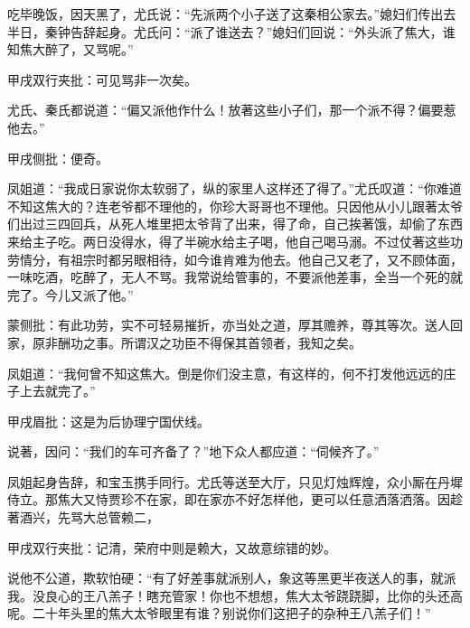 \begin{parag}


    吃毕晚饭，因天黑了，尤氏说：“先派两个小子送了这秦相公家去。”媳妇们传出去半日，秦钟告辞起身。尤氏问：“派了谁送去？”媳妇们回说：“外头派了焦大，谁知焦大醉了，又骂呢。”\begin{note}甲戌双行夹批：可见骂非一次矣。\end{note}尤氏、秦氏都说道：“偏又派他作什么！放著这些小子们，那一个派不得？偏要惹他去。”\begin{note}甲戌侧批：便奇。\end{note}凤姐道：“我成日家说你太软弱了，纵的家里人这样还了得了。”尤氏叹道：“你难道不知这焦大的？连老爷都不理他的，你珍大哥哥也不理他。只因他从小儿跟著太爷们出过三四回兵，从死人堆里把太爷背了出来，得了命，自己挨著饿，却偷了东西来给主子吃。两日没得水，得了半碗水给主子喝，他自己喝马溺。不过仗著这些功劳情分，有祖宗时都另眼相待，如今谁肯难为他去。他自己又老了，又不顾体面，一味吃酒，吃醉了，无人不骂。我常说给管事的，不要派他差事，全当一个死的就完了。今儿又派了他。”\begin{note}蒙侧批：有此功劳，实不可轻易摧折，亦当处之道，厚其赡养，尊其等次。送人回家，原非酬功之事。所谓汉之功臣不得保其首领者，我知之矣。\end{note}凤姐道：“我何曾不知这焦大。倒是你们没主意，有这样的，何不打发他远远的庄子上去就完了。”\begin{note}甲戌眉批：这是为后协理宁国伏线。\end{note}说著，因问：“我们的车可齐备了？”地下众人都应道：“伺候齐了。”
\end{parag}


\begin{parag}


    凤姐起身告辞，和宝玉携手同行。尤氏等送至大厅，只见灯烛辉煌，众小厮在丹墀侍立。那焦大又恃贾珍不在家，即在家亦不好怎样他，更可以任意洒落洒落。因趁著酒兴，先骂大总管赖二，\begin{note}甲戌双行夹批：记清，荣府中则是赖大，又故意综错的妙。\end{note}说他不公道，欺软怕硬：“有了好差事就派别人，象这等黑更半夜送人的事，就派我。没良心的王八羔子！瞎充管家！你也不想想，焦大太爷跷跷脚，比你的头还高呢。二十年头里的焦大太爷眼里有谁？别说你们这把子的杂种王八羔子们！”
\end{parag}


